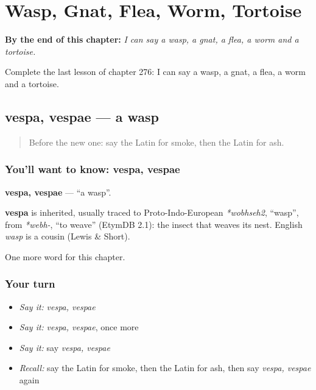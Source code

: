 
\chapter{Wasp, Gnat, Flea, Worm, Tortoise}
\label{ch:la-wasp-gnat-flea-worm-tortoise}

\begin{chapteropening}
\textbf{By the end of this chapter:} \emph{I can say a wasp, a gnat, a flea, a worm and a tortoise.}

Complete the last lesson of chapter 276: I can say a wasp, a gnat, a flea, a worm and a tortoise.
\end{chapteropening}

\section[vespa, vespae]{vespa, vespae — a wasp}

\label{lesson:LA-C276-vespa}



\begin{quote}
Before the new one: say the Latin for smoke, then the Latin for ash.
\end{quote}

\subsection*{You'll want to know: vespa, vespae}
\textbf{vespa, vespae} — \textquotedblleft{}a wasp\textquotedblright{}.

\begin{cousinweb}
\textbf{vespa} is inherited, usually traced to Proto-Indo-European \emph{*wobhseh2}, \textquotedblleft{}wasp\textquotedblright{}, from \emph{*webh-}, \textquotedblleft{}to weave\textquotedblright{} (EtymDB 2.1): the insect that weaves its nest. English \emph{wasp} is a cousin (Lewis \& Short).
\end{cousinweb}

\begin{grammarlens}[title={What you've built}]
One more word for this chapter.
\end{grammarlens}

\subsection*{Your turn}
\begin{itemize}
\raggedright
  \item \emph{Say it:} \emph{vespa, vespae}
  \item \emph{Say it:} \emph{vespa, vespae}, once more
  \item \emph{Say it:} say \emph{vespa, vespae}
  \item \emph{Recall:} say the Latin for smoke, then the Latin for ash, then say \emph{vespa, vespae} again
\end{itemize}

